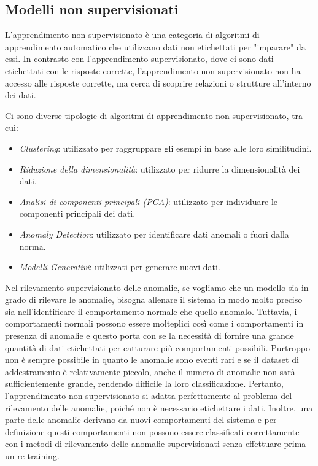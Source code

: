 \subsection{Modelli non supervisionati}
L'apprendimento non supervisionato è una categoria di algoritmi di apprendimento automatico che utilizzano dati non etichettati per "imparare" da essi. In contrasto con l'apprendimento supervisionato, dove ci sono dati etichettati con le risposte corrette, l'apprendimento non supervisionato non ha accesso alle risposte corrette, ma cerca di scoprire relazioni o strutture all'interno dei dati.

Ci sono diverse tipologie di algoritmi di apprendimento non supervisionato, tra cui:
\begin{itemize}
\item \textit{Clustering}: utilizzato per raggruppare gli esempi in base alle loro similitudini.
\item \textit{Riduzione della dimensionalità}: utilizzato per ridurre la dimensionalità dei dati.
\item \textit{Analisi di componenti principali (PCA)}: utilizzato per individuare le componenti principali dei dati.
\item \textit{Anomaly Detection}: utilizzato per identificare dati anomali o fuori dalla norma.
\item \textit{Modelli Generativi}: utilizzati per generare nuovi dati.


\end{itemize}
Nel rilevamento supervisionato delle anomalie, se vogliamo che un modello sia in grado di rilevare le anomalie, bisogna allenare il sistema in modo molto preciso sia nell'identificare il comportamento normale che quello anomalo.
Tuttavia, i comportamenti normali possono essere molteplici così come i
comportamenti in presenza di anomalie e questo porta con se la necessità di fornire una grande quantità di dati etichettati per catturare più comportamenti possibili. Purtroppo non è sempre possibile in quanto le anomalie sono eventi rari e se il dataset di addestramento è relativamente piccolo, anche il numero di anomalie non sarà sufficientemente grande, rendendo difficile la loro classificazione. 
Pertanto, l'apprendimento non supervisionato si adatta perfettamente al problema del rilevamento delle anomalie, poiché non è necessario etichettare i dati. Inoltre, una parte delle anomalie derivano da nuovi comportamenti del sistema e per definizione questi comportamenti non possono essere classificati correttamente con i metodi di rilevamento delle anomalie supervisionati senza effettuare prima un re-training.



